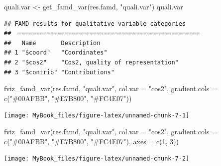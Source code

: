 \documentclass[
  12pt,
  american,
  a4paper,
  extrafontsizes,onecolumn,openright
  ]{memoir}
\newenvironment{Shaded}{\begin{snugshade}}{\end{snugshade}}
\newcommand{\AttributeTok}[1]{\textcolor[rgb]{0.77,0.63,0.00}{#1}}
\newcommand{\DecValTok}[1]{\textcolor[rgb]{0.00,0.00,0.81}{#1}}
\newcommand{\FunctionTok}[1]{\textcolor[rgb]{0.00,0.00,0.00}{#1}}
\newcommand{\NormalTok}[1]{#1}
\newcommand{\OtherTok}[1]{\textcolor[rgb]{0.56,0.35,0.01}{#1}}
\newcommand{\StringTok}[1]{\textcolor[rgb]{0.31,0.60,0.02}{#1}}
\begin{document}
\scriptsize

\begin{Shaded}
\begin{Highlighting}[]
\NormalTok{quali.var }\OtherTok{\textless{}{-}} \FunctionTok{get\_famd\_var}\NormalTok{(res.famd, }\StringTok{"quali.var"}\NormalTok{)}
\NormalTok{quali.var}
\end{Highlighting}
\end{Shaded}

\begin{verbatim}
## FAMD results for qualitative variable categories 
##  ===================================================
##   Name       Description                      
## 1 "$coord"   "Coordinates"                    
## 2 "$cos2"    "Cos2, quality of representation"
## 3 "$contrib" "Contributions"
\end{verbatim}

\begin{Shaded}
\begin{Highlighting}[]
\FunctionTok{fviz\_famd\_var}\NormalTok{(res.famd, }\StringTok{"quali.var"}\NormalTok{, }\AttributeTok{col.var =} \StringTok{"cos2"}\NormalTok{, }\AttributeTok{gradient.cols =} \FunctionTok{c}\NormalTok{(}\StringTok{"\#00AFBB"}\NormalTok{,}
    \StringTok{"\#E7B800"}\NormalTok{, }\StringTok{"\#FC4E07"}\NormalTok{))}
\end{Highlighting}
\end{Shaded}

\begin{center}\texttt{[image: MyBook\_files/figure-latex/unnamed-chunk-7-1]} \end{center}

\begin{Shaded}
\begin{Highlighting}[]
\FunctionTok{fviz\_famd\_var}\NormalTok{(res.famd, }\StringTok{"quali.var"}\NormalTok{, }\AttributeTok{col.var =} \StringTok{"cos2"}\NormalTok{, }\AttributeTok{gradient.cols =} \FunctionTok{c}\NormalTok{(}\StringTok{"\#00AFBB"}\NormalTok{,}
    \StringTok{"\#E7B800"}\NormalTok{, }\StringTok{"\#FC4E07"}\NormalTok{), }\AttributeTok{axes =} \FunctionTok{c}\NormalTok{(}\DecValTok{1}\NormalTok{, }\DecValTok{3}\NormalTok{))}
\end{Highlighting}
\end{Shaded}

\begin{center}\texttt{[image: MyBook\_files/figure-latex/unnamed-chunk-7-2]} \end{center}
\end{document}
